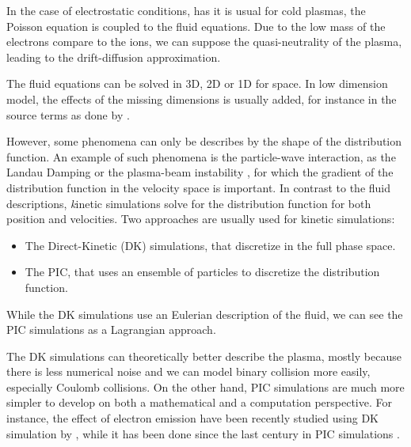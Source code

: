 In the case of electrostatic conditions, has it is usual for cold plasmas, the Poisson equation is coupled to the fluid equations.
Due to the low mass of the electrons compare to the ions, we can suppose the quasi-neutrality of the plasma, leading to the drift-diffusion approximation.

The fluid equations can be solved in \ac{3D}, \ac{2D} or \ac{1D} for space.
In low dimension model, the effects of the missing dimensions is usually added, for instance in the source terms as done by \citet{barral2003a}.

However, some phenomena can only be describes by the shape of the distribution function.
An example of such phenomena is the particle-wave interaction, as the Landau Damping \citep{landau1945,malmberg1964} or the plasma-beam instability \citep{filippychev1990}, for which the gradient of the distribution function in the velocity space is important.
In contrast to the fluid descriptions, {\emph kinetic} simulations solve for the distribution function for both position  and velocities.
Two approaches are usually used for kinetic simulations:
\begin{itemize}
  \item The Direct-Kinetic (DK) simulations, that discretize  in the full phase space.
  \item The \ac{PIC}, that uses an ensemble of particles to discretize the distribution function.
\end{itemize} 
While the \ac{DK} simulations use an Eulerian description of the fluid, we can see the \ac{PIC} simulations as a Lagrangian approach.

The \ac{DK} simulations can theoretically better describe the plasma, mostly because there is less numerical noise and we can model binary collision more easily, especially Coulomb collisions.
On the other hand, \ac{PIC} simulations are much more simpler to develop on both a mathematical and a computation perspective.
For instance, the effect of electron emission have been recently studied using \ac{DK} simulation by \citet{cagas2019}, while it has been done since the last century in \ac{PIC} simulations \citep{boswell1988}.


